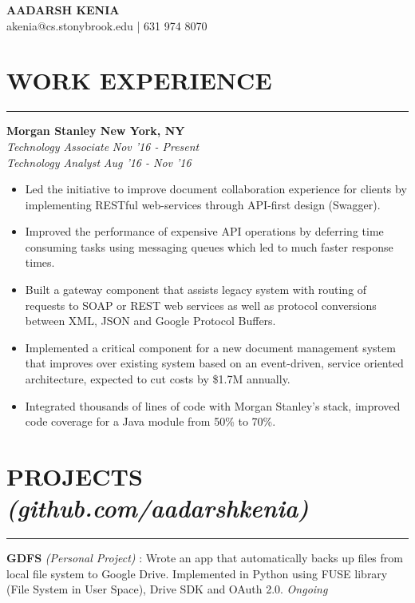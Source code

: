 \documentclass[12pt]{article}
\newcommand{\sectionHeading}[1]{
\vspace{-15pt}
\section*{\small{#1}}
\vspace{-10pt}
\hrule
\vspace{8pt}
}
\newcommand{\sectionHeadingWithLink}[2]{
\vspace{-15pt}
\section*{\small{#1 \textit{#2}}}
\vspace{-10pt}
\hrule
\vspace{8pt}
}
\newcommand{\experienceSectionSubheading}[6]{
  \vspace{-1pt}
    \small{\textbf{Morgan Stanley \hfill New York, NY}} \\
    \small{\textit{#3} \hfill \textit{#4}} \\
    \small{\textit{#5} \hfill \textit{#6}} \\
    \vspace{-20pt}
}
\newcommand {\projectSectionSubheading}[4]{
    \noindent \small{\textbf{#1} \textit{(#2)} : #3  \hfill \textit{#4}} \\
    \vspace{-10pt}
}
\newcommand{\sectionListStart}{
    \begin{itemize}[label={\small{\textbullet}}, leftmargin=20pt] %
}
\newcommand{\sectionListEnd}{\end{itemize} \vspace{0pt}}
\newcommand{\sectionListItem}[1]{\item \small{#1}}
\begin{document}
\begin{center}
\LARGE{\textbf{AADARSH KENIA}}\\
\vspace{4pt}
\small{\Letter \hspace{2mm}akenia@cs.stonybrook.edu} | \Telefon \hspace{2mm}631 974 8070 \\
\vspace{-10pt}
\end{center}

\sectionHeading{WORK EXPERIENCE}
\experienceSectionSubheading
{Morgan Stanley}{New York, NY}
{Technology Associate}{Nov '16 - Present}
{Technology Analyst}{Aug '16 - Nov '16}
\sectionListStart
    \sectionListItem
        Led the initiative to improve document collaboration experience for clients by implementing RESTful web-services through API-first design (Swagger).
    
    \sectionListItem
        Improved the performance of expensive API operations by deferring time consuming tasks using messaging queues which led to much faster response times.
    
    \sectionListItem
        Built a gateway component that assists legacy system with routing of requests to SOAP or REST web services as well as protocol conversions between XML, JSON and Google Protocol Buffers.
    
    \sectionListItem
        Implemented a critical component for a new document management system that improves over existing system based on an event-driven, service oriented architecture, expected to cut costs by \$1.7M annually.
    
    \sectionListItem
        Integrated thousands of lines of code with Morgan Stanley's  stack, improved code coverage for a Java module from 50\% to 70\%.
     
    
        
\sectionListEnd

\sectionHeadingWithLink{PROJECTS}{(github.com/aadarshkenia)}
\projectSectionSubheading{GDFS}{Personal Project}{Wrote an app that automatically backs up files from local file system to Google Drive. Implemented in Python using FUSE library (File System in User Space), Drive SDK and OAuth 2.0.}{Ongoing}
\end{document}
